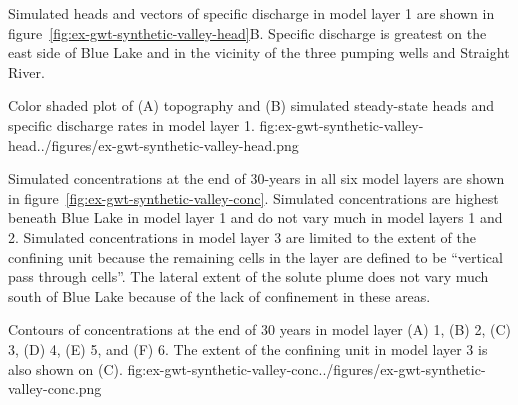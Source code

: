 Simulated heads and vectors of specific discharge in model layer 1 are shown in figure~\ref{fig:ex-gwt-synthetic-valley-head}B. Specific discharge is greatest on the east side of Blue Lake and in the vicinity of the three pumping wells and Straight River. 

\begin{StandardFigure}{
                                     Color shaded plot of (A) topography and (B) simulated steady-state heads and specific discharge rates in model layer 1.
                                     }{fig:ex-gwt-synthetic-valley-head}{../figures/ex-gwt-synthetic-valley-head.png}
\end{StandardFigure}                                 


Simulated concentrations at the end of 30-years in all six model layers are shown in figure~\ref{fig:ex-gwt-synthetic-valley-conc}. Simulated concentrations are highest beneath Blue Lake in model layer 1 and do not vary much in model layers 1 and 2. Simulated concentrations in model layer 3 are limited to the extent of the confining unit because the remaining cells in the layer are defined to be ``vertical pass through cells''. The lateral extent of the solute plume does not vary much south of Blue Lake because of the lack of confinement in these areas.

\begin{StandardFigure}{
                                     Contours of concentrations at the end of 30 years in model layer (A) 1, (B) 2, (C) 3, (D) 4, (E) 5, and (F) 6. The extent of the confining unit in model layer 3 is also shown on (C).
                                     }{fig:ex-gwt-synthetic-valley-conc}{../figures/ex-gwt-synthetic-valley-conc.png}
\end{StandardFigure}                                  
